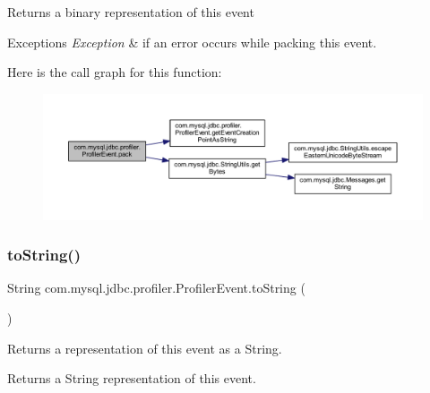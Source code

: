 \begin{DoxyReturn}{Returns}
a binary representation of this event 
\end{DoxyReturn}

\begin{DoxyExceptions}{Exceptions}
{\em Exception} & if an error occurs while packing this event. \\
\hline
\end{DoxyExceptions}
Here is the call graph for this function\+:
\nopagebreak
\begin{figure}[H]
\begin{center}
\leavevmode
\includegraphics[width=350pt]{classcom_1_1mysql_1_1jdbc_1_1profiler_1_1_profiler_event_aca4cafacdd420d38a2fbf0213d3e7a43_cgraph}
\end{center}
\end{figure}
\mbox{\label{classcom_1_1mysql_1_1jdbc_1_1profiler_1_1_profiler_event_a492ffcc14034b9eaae70948322566592}} 
\subsubsection{\texorpdfstring{to\+String()}{toString()}}
{\footnotesize\ttfamily String com.\+mysql.\+jdbc.\+profiler.\+Profiler\+Event.\+to\+String (\begin{DoxyParamCaption}{ }\end{DoxyParamCaption})}

Returns a representation of this event as a String.

\begin{DoxyReturn}{Returns}
a String representation of this event. 
\end{DoxyReturn}
\mbox{\label{classcom_1_1mysql_1_1jdbc_1_1profiler_1_1_profiler_event_ae4fb6b9cacc1749a77df0c3eec048a8e}} 
